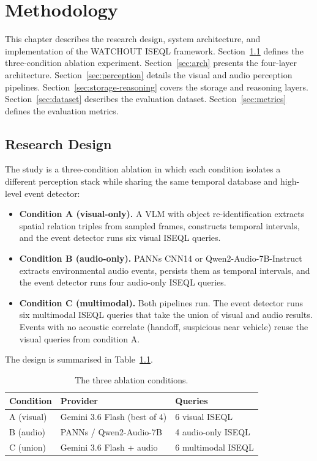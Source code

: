 \chapter{Methodology}
\label{Methodology}

This chapter describes the research design, system architecture, and implementation of the WATCHOUT ISEQL framework. Section~\ref{sec:design} defines the three-condition ablation experiment. Section~\ref{sec:arch} presents the four-layer architecture. Section~\ref{sec:perception} details the visual and audio perception pipelines. Section~\ref{sec:storage-reasoning} covers the storage and reasoning layers. Section~\ref{sec:dataset} describes the evaluation dataset. Section~\ref{sec:metrics} defines the evaluation metrics.

\section{Research Design}
\label{sec:design}

The study is a three-condition ablation in which each condition isolates a different perception stack while sharing the same temporal database and high-level event detector:

\begin{itemize}
  \item \textbf{Condition A (visual-only).} A VLM with object re-identification extracts spatial relation triples from sampled frames, constructs temporal intervals, and the event detector runs six visual ISEQL queries.
  \item \textbf{Condition B (audio-only).} PANNs CNN14 or Qwen2-Audio-7B-Instruct extracts environmental audio events, persists them as temporal intervals, and the event detector runs four audio-only ISEQL queries.
  \item \textbf{Condition C (multimodal).} Both pipelines run. The event detector runs six multimodal ISEQL queries that take the union of visual and audio results. Events with no acoustic correlate (handoff, suspicious near vehicle) reuse the visual queries from condition A.
\end{itemize}

The design is summarised in Table~\ref{tab:three_conditions}.

\begin{table}[h]
  \centering
  \caption{The three ablation conditions.}
  \label{tab:three_conditions}
  \begin{tabular}{l p{3cm} p{3.8cm}}
    \toprule
    Condition & Provider & Queries \\
    \midrule
    A (visual)  & Gemini 3.6 Flash (best of 4) & 6 visual ISEQL \\
    B (audio)   & PANNs / Qwen2-Audio-7B & 4 audio-only ISEQL \\
    C (union)   & Gemini 3.6 Flash + audio & 6 multimodal ISEQL \\
    \bottomrule
  \end{tabular}
\end{table}

